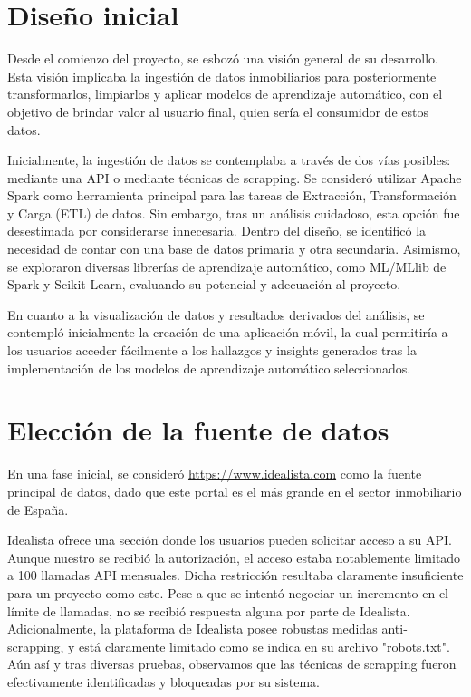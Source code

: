 
\section{Diseño inicial}

Desde el comienzo del proyecto, se esbozó una visión general de su desarrollo. Esta visión implicaba la ingestión de datos inmobiliarios para posteriormente transformarlos, limpiarlos y aplicar modelos de aprendizaje automático, con el objetivo de brindar valor al usuario final, quien sería el consumidor de estos datos.

Inicialmente, la ingestión de datos se contemplaba a través de dos vías posibles: mediante una API o mediante técnicas de scrapping. Se consideró utilizar Apache Spark como herramienta principal para las tareas de Extracción, Transformación y Carga (ETL) de datos. Sin embargo, tras un análisis cuidadoso, esta opción fue desestimada por considerarse innecesaria. Dentro del diseño, se identificó la necesidad de contar con una base de datos primaria y otra secundaria. Asimismo, se exploraron diversas librerías de aprendizaje automático, como ML/MLlib de Spark y Scikit-Learn, evaluando su potencial y adecuación al proyecto.

En cuanto a la visualización de datos y resultados derivados del análisis, se contempló inicialmente la creación de una aplicación móvil, la cual permitiría a los usuarios acceder fácilmente a los hallazgos y insights generados tras la implementación de los modelos de aprendizaje automático seleccionados.


\section{Elección de la fuente de datos}

En una fase inicial, se consideró \url{https://www.idealista.com} como la fuente principal de datos, dado que este portal es el más grande en el sector inmobiliario de España.

Idealista ofrece una sección donde los usuarios pueden solicitar acceso a su API. Aunque nuestro se recibió la autorización, el acceso estaba notablemente limitado a 100 llamadas API mensuales. Dicha restricción resultaba claramente insuficiente para un proyecto como este. Pese a que se intentó negociar un incremento en el límite de llamadas, no se recibió respuesta alguna por parte de Idealista. Adicionalmente, la plataforma de Idealista posee robustas medidas anti-scrapping, y está claramente limitado como se indica en su archivo "robots.txt". Aún así y tras diversas pruebas, observamos que las técnicas de scrapping fueron efectivamente identificadas y bloqueadas por su sistema.

